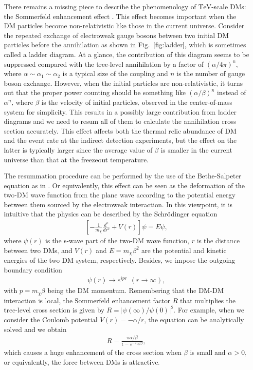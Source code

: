 \documentclass[12pt,twoside,book]{article}
\begin{document}
There remains a missing piece to describe the phenomenology of $\mathrm{TeV}$-scale DMs: the Sommerfeld enhancement effect \cite{Hisano:2004ds, Hisano:2006nn}.
This effect becomes important when the DM particles become non-relativistic like those in the current universe.
Consider the repeated exchange of electroweak gauge bosons between two initial DM particles before the annihilation as shown in Fig.~\ref{fig:ladder}, which is sometimes called a ladder diagram.
At a glance, the contribution of this diagram seems to be suppressed compared with the tree-level annihilation by a factor of $(\alpha/4\pi)^n$, where $\alpha \sim \alpha_1 \sim \alpha_2$ is a typical size of the coupling and $n$ is the number of gauge boson exchange.
However, when the initial particles are non-relativistic, it turns out that the proper power counting should be something like $(\alpha/\beta)^n$ instead of $\alpha^n$, where $\beta$ is the velocity of initial particles, observed in the center-of-mass system for simplicity.
This results in a possibly large contribution from ladder diagrams and we need to resum all of them to calculate the annihilation cross section accurately.
This effect affects both the thermal relic abundance of DM and the event rate at the indirect detection experiments, but the effect on the latter is typically larger since the average value of $\beta$ is smaller in the current universe than that at the freezeout temperature.

The resummation procedure can be performed by the use of the Bethe-Salpeter equation \cite{Salpeter:1951sz} as in \cite{Strassler:1990nw}.
Or equivalently, this effect can be seen as the deformation of the two-DM wave function from the plane wave according to the potential energy between them sourced by the electroweak interaction.
In this viewpoint, it is intuitive that the physics can be described by the Schr\"{o}dinger equation
\begin{align}
  \left[ - \frac{1}{m_\chi} \frac{d^2}{d r^2} + V(r) \right] \psi = E \psi,
\end{align}
where $\psi(r)$ is the s-wave part of the two-DM wave function, $r$ is the distance between two DMs, and $V(r)$ and $E = m_\chi \beta^2$ are the potential and kinetic energies of the two DM system, respectively.
Besides, we impose the outgoing boundary condition
\begin{align}
  \psi(r) \to e^{i p r} ~~ (r \to \infty),
\end{align}
with $p = m_\chi \beta$ being the DM momentum.
Remembering that the DM-DM interaction is local, the Sommerfeld enhancement factor $R$ that multiplies the tree-level cross section is given by $R = \left| \psi(\infty) / \psi(0) \right|^2$.
For example, when we consider the Coulomb potential $V(r) = -\alpha / r$, the equation can be analytically solved and we obtain
\begin{align}
  R = \frac{\pi \alpha / \beta}{1 - e^{- \pi \alpha / \beta}},
\end{align}
which causes a huge enhancement of the cross section when $\beta$ is small and $\alpha > 0$, or equivalently, the force between DMs is attractive.
\end{document}
